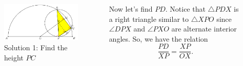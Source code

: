 \documentclass[professionalfont, 12pt, handout, t]{beamer} %
\theoremstyle{plain}
\theoremstyle{definition}
\begin{document}
\begin{frame}{}
    \begin{columns}    
        \begin{figure}[h]
            \centering
            \includegraphics[scale=0.3]{Geometry Solution 1.PNG}
            \captionsetup{labelformat=empty}
            \caption{Solution 1: Find the height $PC$}
        \end{figure}

        Now let's find $PD$.
        \pause
        Notice that $\triangle PDX$ is a right triangle similar to $\triangle XPO$ since $\angle DPX$ and $\angle PXO$ are alternate interior angles.
        \pause
        So, we have the relation
        \[
            \frac{PD}{XP} = \frac{XP}{OX}.
        \]
    \end{columns}
\end{frame}
\end{document}
